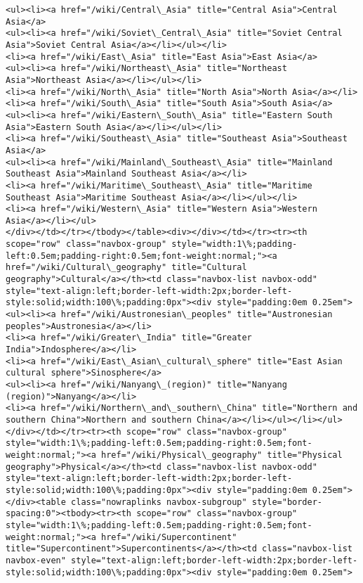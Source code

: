 \documentclass[11pt]{article}
\begin{document}
\begin{Verbatim}[commandchars=\\\{\}]
<ul><li><a href="/wiki/Central\_Asia" title="Central Asia">Central Asia</a>
<ul><li><a href="/wiki/Soviet\_Central\_Asia" title="Soviet Central Asia">Soviet Central Asia</a></li></ul></li>
<li><a href="/wiki/East\_Asia" title="East Asia">East Asia</a>
<ul><li><a href="/wiki/Northeast\_Asia" title="Northeast Asia">Northeast Asia</a></li></ul></li>
<li><a href="/wiki/North\_Asia" title="North Asia">North Asia</a></li>
<li><a href="/wiki/South\_Asia" title="South Asia">South Asia</a>
<ul><li><a href="/wiki/Eastern\_South\_Asia" title="Eastern South Asia">Eastern South Asia</a></li></ul></li>
<li><a href="/wiki/Southeast\_Asia" title="Southeast Asia">Southeast Asia</a>
<ul><li><a href="/wiki/Mainland\_Southeast\_Asia" title="Mainland Southeast Asia">Mainland Southeast Asia</a></li>
<li><a href="/wiki/Maritime\_Southeast\_Asia" title="Maritime Southeast Asia">Maritime Southeast Asia</a></li></ul></li>
<li><a href="/wiki/Western\_Asia" title="Western Asia">Western Asia</a></li></ul>
</div></td></tr></tbody></table><div></div></td></tr><tr><th scope="row" class="navbox-group" style="width:1\%;padding-left:0.5em;padding-right:0.5em;font-weight:normal;"><a href="/wiki/Cultural\_geography" title="Cultural geography">Cultural</a></th><td class="navbox-list navbox-odd" style="text-align:left;border-left-width:2px;border-left-style:solid;width:100\%;padding:0px"><div style="padding:0em 0.25em">
<ul><li><a href="/wiki/Austronesian\_peoples" title="Austronesian peoples">Austronesia</a></li>
<li><a href="/wiki/Greater\_India" title="Greater India">Indosphere</a></li>
<li><a href="/wiki/East\_Asian\_cultural\_sphere" title="East Asian cultural sphere">Sinosphere</a>
<ul><li><a href="/wiki/Nanyang\_(region)" title="Nanyang (region)">Nanyang</a></li>
<li><a href="/wiki/Northern\_and\_southern\_China" title="Northern and southern China">Northern and southern China</a></li></ul></li></ul>
</div></td></tr><tr><th scope="row" class="navbox-group" style="width:1\%;padding-left:0.5em;padding-right:0.5em;font-weight:normal;"><a href="/wiki/Physical\_geography" title="Physical geography">Physical</a></th><td class="navbox-list navbox-odd" style="text-align:left;border-left-width:2px;border-left-style:solid;width:100\%;padding:0px"><div style="padding:0em 0.25em"></div><table class="nowraplinks navbox-subgroup" style="border-spacing:0"><tbody><tr><th scope="row" class="navbox-group" style="width:1\%;padding-left:0.5em;padding-right:0.5em;font-weight:normal;"><a href="/wiki/Supercontinent" title="Supercontinent">Supercontinents</a></th><td class="navbox-list navbox-even" style="text-align:left;border-left-width:2px;border-left-style:solid;width:100\%;padding:0px"><div style="padding:0em 0.25em">

\end{Verbatim}
\end{document}
